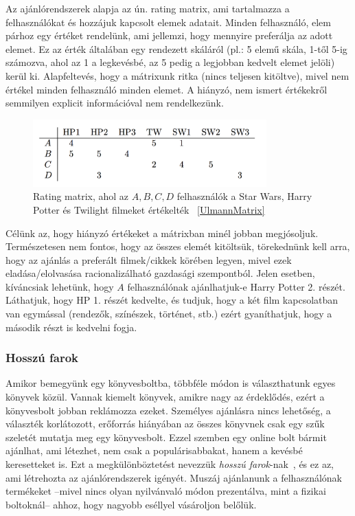 \documentclass[a4paper,12pt]{article}
\begin{document}
Az ajánlórendszerek alapja az ún. rating matrix, ami tartalmazza a felhasználókat és hozzájuk kapcsolt elemek adatait. Minden felhasználó, elem párhoz egy értéket rendelünk, ami jellemzi, hogy mennyire preferálja az adott elemet. Ez az érték általában egy rendezett skáláról (pl.: 5 elemű skála, 1-től 5-ig számozva, ahol az 1 a legkevésbé, az 5 pedig a legjobban kedvelt elemet jelöli) kerül ki. Alapfeltevés, hogy a mátrixunk ritka (nincs teljesen kitöltve), mivel nem értékel minden felhasználó minden elemet. A hiányzó, nem ismert értékekről semmilyen explicit információval nem rendelkezünk.

\begin{figure}[ht!]
\centering
\includegraphics[width=90mm]{img/um.png}
\caption{Rating matrix, ahol az $A,B, C, D$ felhasználók a Star Wars, Harry Potter és Twilight filmeket értékelték ~\ref{UlmannMatrix} \label{um}}
\end{figure}

Célünk az, hogy hiányzó értékeket a mátrixban minél jobban megjósoljuk. Természetesen nem fontos, hogy az összes elemét kitöltsük, törekednünk kell arra, hogy az ajánlás a preferált filmek/cikkek körében legyen, mivel ezek eladása/elolvasása racionalizálható gazdasági szempontból. Jelen esetben, kíváncsiak lehetünk, hogy $A$ felhasználónak ajánlhatjuk-e Harry Potter 2. részét. Láthatjuk, hogy HP 1. részét kedvelte, és tudjuk, hogy a két film kapcsolatban van egymással (rendezők, színészek, történet, stb.) ezért gyaníthatjuk, hogy a második részt is kedvelni fogja.

\subsubsection{Hosszú farok}

Amikor bemegyünk egy könyvesboltba, többféle módon is választhatunk egyes könyvek közül. Vannak kiemelt könyvek, amikre nagy az érdeklődés, ezért a könyvesbolt jobban reklámozza ezeket. Személyes ajánlásra nincs lehetőség, a választék korlátozott, erőforrás hiányában az összes könyvnek csak egy szűk szeletét mutatja meg egy könyvesbolt. Ezzel szemben egy online bolt bármit ajánlhat, ami létezhet, nem csak a populárisabbakat, hanem a kevésbé keresetteket is. Ezt a megkülönböztetést nevezzük \textsl{hosszú farok}-nak~\cite{longtail}, és ez az, ami létrehozta az ajánlórendszerek igényét. Muszáj ajánlanunk a felhasználónak termékeket --mivel nincs olyan nyilvánvaló módon prezentálva, mint a fizikai boltoknál-- ahhoz, hogy nagyobb eséllyel vásároljon belőlük.
\end{document}
